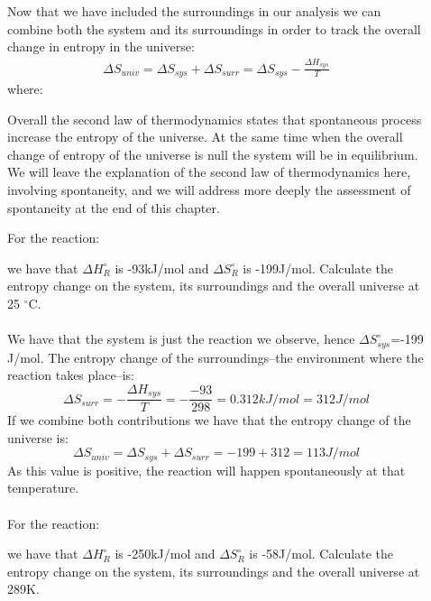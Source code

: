 \documentclass[main.tex]{subfiles}
\newcommand\chapterlabel{entropy}
\begin{document}
\begin{description}
\item[] 
Now that we have included the surroundings in our analysis we can combine both the system and its surroundings in order to track the overall change in entropy in the universe:
\begin{equation}\begin{split}
\boxed{  \Delta S_{univ}=\Delta S_{sys}+ \Delta S_{surr}=\Delta S_{sys} -\frac{\Delta H_{sys}}{T}    }
\label{\chapterlabel:equation5}
\end{split}\end{equation}
where:
Overall the second law of thermodynamics states that spontaneous process increase the entropy of the universe. At the same time when the overall change of entropy of the universe is null the system will be in equilibrium. We will leave the explanation of the second law of thermodynamics here, involving spontaneity, and we will address more deeply the assessment of spontaneity at the end of this chapter.
\begin{example} %
For the reaction:
\begin{center}\end{center}
we have that $\Delta H_{R}^{\circ}$ is -93kJ/mol and $\Delta S_{R}^{\circ}$ is -199J/mol. Calculate the entropy change on the system, its surroundings and the overall universe at 25 $^{\circ}$C.\\
\\
We have that the system is just the reaction we observe, hence $\Delta S_{sys}^{\circ}$=-199 J/mol. The entropy change of the surroundings--the environment where the reaction takes place--is:
\[ \Delta S_{surr}=-\frac{\Delta H_{sys}}{T}   =-\frac{-93}{298}=0.312kJ/mol=312J/mol\]
If we combine both contributions we have that the entropy change of the universe is:
\[ \Delta S_{univ}=\Delta S_{sys}+ \Delta S_{surr}= -199+312=113J/mol	\]
As this value is positive, the reaction will happen spontaneously at that temperature.
\\
\faDiamond\ \\
For the reaction:
\begin{center}\end{center}
we have that $\Delta H_{R}^{\circ}$ is -250kJ/mol and $\Delta S_{R}^{\circ}$ is -58J/mol. Calculate the entropy change on the system, its surroundings and the overall universe at 289K.\\


\end{example}
\end{description}
\end{document}

